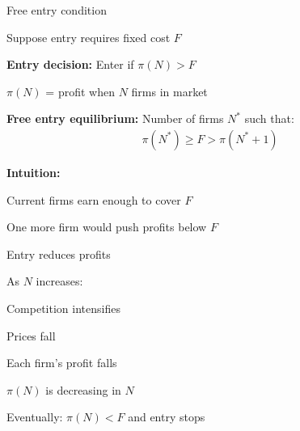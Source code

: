 \documentclass[notes,11pt, aspectratio=169]{beamer}
\newenvironment{wideitemize}{\itemize\addtolength{\itemsep}{10pt}}{\enditemize}
\begin{document}
\begin{frame}{Free entry condition}
	\begin{wideitemize}
		\item Suppose entry requires fixed cost $F$
		\item \textbf{Entry decision:} Enter if $\pi(N) > F$
		\begin{wideitemize}
			\vspace{5pt}
			\item $\pi(N)$ = profit when $N$ firms in market
		\end{wideitemize}
		\item \textbf{Free entry equilibrium:} Number of firms $N^*$ such that:
		\begin{align*}
			\pi(N^*) \geq F > \pi(N^* + 1)
		\end{align*}
		\item \textbf{Intuition:}
		\begin{wideitemize}
			\vspace{5pt}
			\item Current firms earn enough to cover $F$
			\item One more firm would push profits below $F$
		\end{wideitemize}
	\end{wideitemize}
\end{frame}

\begin{frame}{Entry reduces profits}
	\begin{wideitemize}
		\item As $N$ increases:
		\begin{wideitemize}
			\vspace{5pt}
			\item Competition intensifies
			\item Prices fall
			\item Each firm's profit falls
		\end{wideitemize}
		\item $\pi(N)$ is decreasing in $N$
		\item Eventually: $\pi(N) < F$ and entry stops
	\end{wideitemize}
\end{frame}
\end{document}
